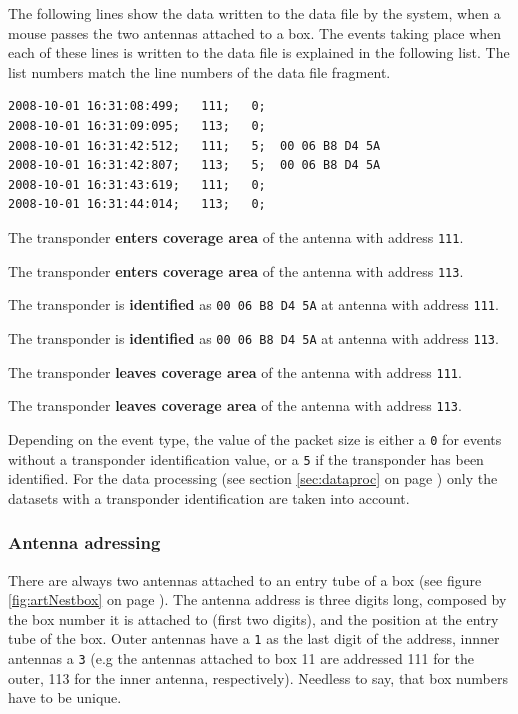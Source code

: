 The following lines show the data written to the data file by the system, when a mouse passes the two antennas attached to a box. The events taking place when each of these lines is written to the data file is explained in the following list. The list numbers match the line numbers of the data file fragment. 

\numcodestyle
\begin{lstlisting}[frame=none]
2008-10-01 16:31:08:499;   111;   0; 
2008-10-01 16:31:09:095;   113;   0; 
2008-10-01 16:31:42:512;   111;   5;  00 06 B8 D4 5A
2008-10-01 16:31:42:807;   113;   5;  00 06 B8 D4 5A
2008-10-01 16:31:43:619;   111;   0; 
2008-10-01 16:31:44:014;   113;   0;
\end{lstlisting}

\begin{condensed_enum}
  \item The transponder \textbf{enters coverage area} of the antenna with address \lstinline|111|.
  \item The transponder \textbf{enters coverage area} of the antenna with address \lstinline|113|.
  \item The transponder is \textbf{identified} as \lstinline|00 06 B8 D4 5A| at antenna with address \lstinline|111|.
  \item The transponder is \textbf{identified} as \lstinline|00 06 B8 D4 5A| at antenna with address \lstinline|113|.
  \item The transponder \textbf{leaves coverage area} of the antenna with address \lstinline|111|.
  \item The transponder \textbf{leaves coverage area} of the antenna with address \lstinline|113|. 
\end{condensed_enum}
 
Depending on the event type, the value of the packet size is either a \lstinline|0| for events without a transponder identification value, or a \lstinline|5| if the transponder has been identified. For the data processing (see section \ref{sec:dataproc} on page \pageref{sec:dataproc}) only the datasets with a transponder identification are taken into account.

\subsubsection{Antenna adressing}
\label{subsubsec:addressing}

There are always two antennas attached to an entry tube of a box (see figure \ref{fig:artNestbox} on page \pageref{fig:artNestbox}). The antenna address is three digits long, composed by the box number it is attached to (first two digits), and the position at the entry tube of the box. Outer antennas have a \lstinline|1| as the last digit of the address, innner antennas a \lstinline|3| (e.g the antennas attached to box 11 are addressed 111 for the outer, 113 for the inner antenna, respectively). Needless to say, that box numbers have to be unique.

